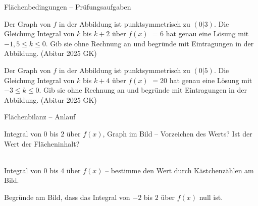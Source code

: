 \begin{aufgabe}{Flächenbedingungen – Prüfungsaufgaben}
\begin{teile}
\teil Der Graph von $f$ in der Abbildung ist punktsymmetrisch zu $(0|3)$. Die Gleichung Integral von $k$ bis $k + 2$ über $f(x)$ $= 6$ hat genau eine Lösung mit $-1{,}5 \le k \le 0$. Gib sie ohne Rechnung an und begründe mit Eintragungen in der Abbildung. \hfill (Abitur 2025 GK)

\begin{ksys}[xmin=-3,xmax=3,ymin=-1,ymax=6,ablesen]\end{ksys}
\teil Der Graph von $f$ in der Abbildung ist punktsymmetrisch zu $(0|5)$. Die Gleichung Integral von $k$ bis $k + 4$ über $f(x)$ $= 20$ hat genau eine Lösung mit $-3 \le k \le 0$. Gib sie ohne Rechnung an und begründe mit Eintragungen in der Abbildung. \hfill (Abitur 2025 GK)

\begin{ksys}[xmin=-3,xmax=3,ymin=-1,ymax=9,ablesen]\end{ksys}
\end{teile}
\end{aufgabe}

\begin{aufgabe}{Flächenbilanz – Anlauf}
\begin{teile}
\teil Integral von $0$ bis $2$ über $f(x)$, Graph im Bild – Vorzeichen des Werts? Ist der Wert der Flächeninhalt? \\ \\ 

\begin{ksys}[xmin=-3,xmax=5,ymin=-4,ymax=4,xstep=1,ystep=1,ablesen]\end{ksys}
\teil Integral von $0$ bis $4$ über $f(x)$ – bestimme den Wert durch Kästchenzählen am Bild.

\begin{ksys}[xmin=-1,xmax=5,ymin=-4,ymax=4,xstep=1,ystep=1,ablesen]\end{ksys}
\teil Begründe am Bild, dass das Integral von $-2$ bis $2$ über $f(x)$ null ist.

\begin{ksys}[xmin=-3,xmax=5,ymin=-4,ymax=4,xstep=1,ystep=1,ablesen]\end{ksys}
\end{teile}
\end{aufgabe}

